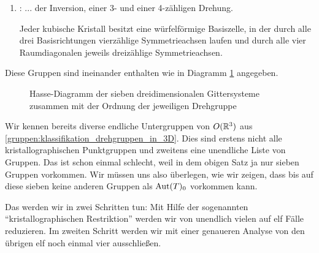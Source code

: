 \begin{theoremdef}
\begin{enumerate}
\item {}: ... der Inversion, einer 3- und einer 4-zähligen Drehung.

Jeder kubische Kristall besitzt eine würfelförmige Basiszelle, in der durch alle drei Basisrichtungen vierzählige Symmetrieachsen laufen und durch alle vier Raumdiagonalen jeweils dreizählige Symmetrieachsen.
\end{enumerate}
Diese Gruppen sind ineinander enthalten wie in Diagramm \ref{kristalle:hasse_diagramm_Gittersysteme} angegeben.
\end{theoremdef}

\begin{figure}[ht]
\caption{Hasse-Diagramm der sieben dreidimensionalen Gittersysteme zusammen mit der Ordnung der jeweiligen Drehgruppe}
\label{kristalle:hasse_diagramm_Gittersysteme}
\end{figure}

\begin{remark}
Wir kennen bereits diverse endliche Untergruppen von $O(\mathbb{R}^3)$ aus \ref{gruppen:klassifikation_drehgruppen_in_3D}. Dies sind erstens nicht alle kristallographischen Punktgruppen und zweitens eine unendliche Liste von Gruppen. Das ist schon einmal schlecht, weil in dem obigen Satz ja nur sieben Gruppen vorkommen. Wir müssen uns also überlegen, wie wir zeigen, dass bis auf diese sieben keine anderen Gruppen als $\operatorname{Aut}(T)_0$ vorkommen kann.

Das werden wir in zwei Schritten tun: Mit Hilfe der sogenannten \enquote{kristallographischen Restriktion} werden wir von unendlich vielen auf elf Fälle reduzieren. Im zweiten Schritt werden wir mit einer genaueren Analyse von den übrigen elf noch einmal vier ausschließen.
\end{remark}

